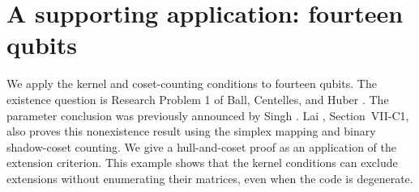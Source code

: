 \section{A supporting application: fourteen qubits}\label{sec:fourteen}

We apply the kernel and coset-counting conditions to fourteen qubits.
The existence question is Research Problem 1 of Ball, Centelles, and Huber
\cite{ball}.
The parameter conclusion was previously announced by Singh
\cite{singh}. Lai \cite{lai}, Section~VII-C1, also proves this nonexistence
result using the simplex mapping and binary shadow-coset counting.
We give a hull-and-coset proof as an application of the
extension criterion. This example shows that the kernel conditions can exclude extensions
without enumerating their matrices, even when the code is degenerate.

